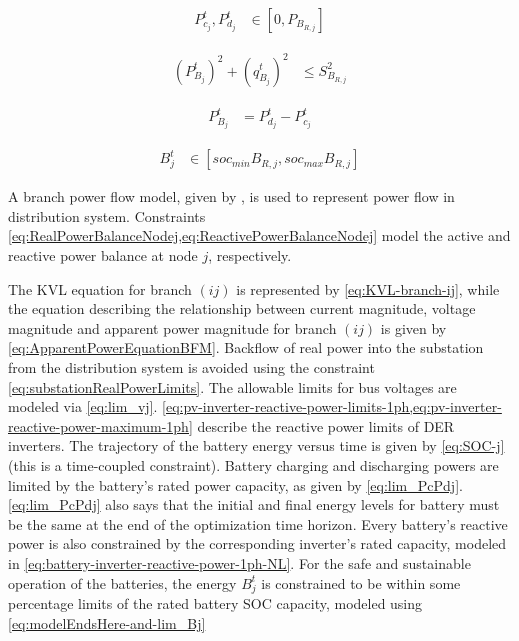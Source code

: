 \documentclass[../../outputs/main.tex]{subfiles}
\begin{document}
\vspace{-1.5em} %

\begin{align}
    { P^{t}_{c_{j}}, P^{t}_{d_{j}} }
    &\in
    { \left[ 0, P_{B_{R, j}} \right]}\label{eq:lim_PcPdj}
\end{align}

\vspace{-1.5em} %

\begin{align}
    {(P_{B_j}^t)^2 + (q_{B_j}^t)^2} &\leq {S_{B_{R, j}}^2}
    \label{eq:battery-inverter-reactive-power-1ph-NL}
\end{align}


\begin{align}
{ P_{B_j}^t } &= { P_{d_j}^t - P_{c_j}^t } \label{eq:battery-power-output-definition}
\end{align}
\vspace{-1.5em} %

\begin{align}
    { B^{t}_{j} } &\in { \left[ soc_{min}B_{R, j}, soc_{max}B_{R, j} \right] } \label{eq:modelEndsHere-and-lim_Bj}
\end{align}

A branch power flow model, given by , is used to represent power flow in distribution system.   Constraints \cref{eq:RealPowerBalanceNodej,eq:ReactivePowerBalanceNodej} model the active and reactive power balance at node $j$, respectively.

The KVL equation for branch $(ij)$ is represented by \cref{eq:KVL-branch-ij}, while the equation describing the relationship between current magnitude, voltage magnitude and apparent power magnitude for branch $(ij)$ is given by \cref{eq:ApparentPowerEquationBFM}. Backflow of real power into the substation from the distribution system is avoided using the constraint \cref{eq:substationRealPowerLimits}. The allowable limits for bus voltages are modeled via \cref{eq:lim_vj}. \cref{eq:pv-inverter-reactive-power-limits-1ph,eq:pv-inverter-reactive-power-maximum-1ph} describe the reactive power limits of DER inverters. The trajectory of the battery energy versus time is given by \cref{eq:SOC-j} (this is a time-coupled constraint). Battery charging and discharging powers are limited by the battery's rated power capacity, as given by \cref{eq:lim_PcPdj}. \cref{eq:lim_PcPdj} also says that the initial and final energy levels for battery must be the same at the end of the optimization time horizon. Every battery's reactive power is also constrained by the corresponding inverter's rated capacity, modeled in \cref{eq:battery-inverter-reactive-power-1ph-NL}. For the safe and sustainable operation of the batteries, the energy $B^{t}_{j}$ is constrained to be within some percentage limits of the rated battery SOC capacity, modeled using \cref{eq:modelEndsHere-and-lim_Bj}
\end{document}
